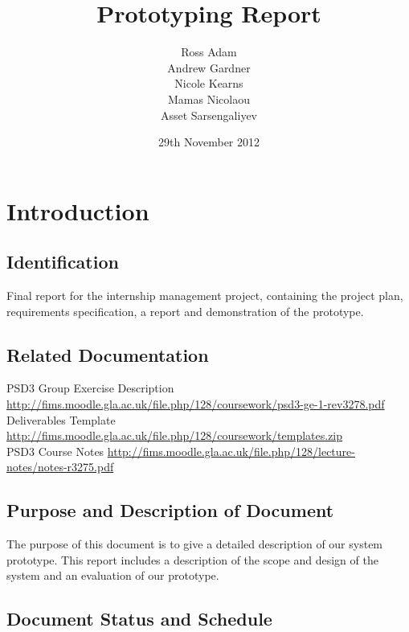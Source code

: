 \documentclass{l3deliverable}
\title{Prototyping Report}
\author{Ross Adam \\
        Andrew Gardner \\
        Nicole Kearns \\
        Mamas Nicolaou\\
	Asset Sarsengaliyev\\}
\date{29th November 2012}
\begin{document}

\maketitle

\tableofcontents

\newpage


\section{Introduction}

\subsection{Identification}
Final report for the internship management project, containing the project plan, requirements specification, a report and demonstration of the prototype.

\subsection{Related Documentation}

PSD3 Group Exercise Description \url{http://fims.moodle.gla.ac.uk/file.php/128/coursework/psd3-ge-1-rev3278.pdf}\\

Deliverables Template \url{http://fims.moodle.gla.ac.uk/file.php/128/coursework/templates.zip}\\

PSD3 Course Notes \url{http://fims.moodle.gla.ac.uk/file.php/128/lecture-notes/notes-r3275.pdf}\\

\subsection{Purpose and Description of Document}
The purpose of this document is to give a detailed description of our
system prototype. This report includes a description of the scope and
design of the system and an evaluation of our prototype.
\subsection{Document Status and Schedule}
\end{document}
